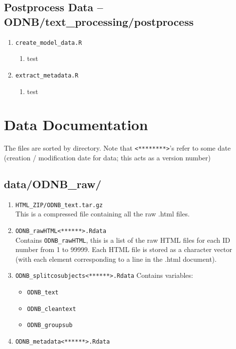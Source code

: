 \documentclass[11pt]{article}
\newcommand{\filename}[1]{\texttt{#1}}
\begin{document}
\subsection{Postprocess Data -- ODNB/text\_processing/postprocess}
\begin{enumerate}
\item \filename{create\_model\_data.R}
\begin{enumerate}
\item test
\end{enumerate}


\item \filename{extract\_metadata.R}
\begin{enumerate}
\item test
\end{enumerate}


\end{enumerate}




\section{Data Documentation}
The files are sorted by directory. Note that \texttt{<********>}'s refer to some date (creation / modification date for data; this acts as a version number)

\subsection{data/ODNB\_raw/}
\begin{enumerate}
\item \filename{HTML\_ZIP/ODNB\_text.tar.gz} \\
This is a compressed file containing all the raw .html files. \\

\item \filename{ODNB\_rawHTML<******>.Rdata} \\
Contains \texttt{ODNB\_rawHTML}, this is a list of the raw HTML files for each ID number from 1 to 99999. Each HTML file is stored as a character vector (with each element corresponding to a line in the .html document).  

\item \filename{ODNB\_splitcosubjects<******>.Rdata}
Contains variables: 
\begin{itemize}
\item \texttt{ODNB\_text}
\item \texttt{ODNB\_cleantext}
\item \texttt{ODNB\_groupsub}
\end{itemize}

\item \filename{ODNB\_metadata<******>.Rdata}

\end{enumerate}
\end{document}
